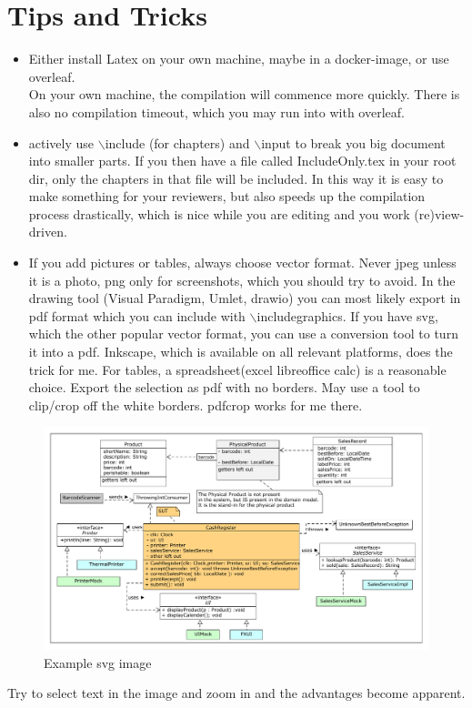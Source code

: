 \chapter{Tips and Tricks}

\begin{itemize}
\item Either install Latex on your own machine, maybe in a docker-image, or use overleaf. \\
    On your own machine, the compilation will commence more quickly. There is also no compilation timeout, which you may run into with overleaf.
\item actively use $\backslash$include (for chapters) and $\backslash$input to break you 
 big document into smaller parts. If you then have a file called IncludeOnly.tex in your root dir, only the chapters in that file will be included. In this way it is easy to make something for your reviewers, but also speeds up the compilation process drastically, which is nice while you are editing and you work (re)view-driven.
\item If you add pictures or tables, always choose vector format. Never jpeg unless it is a photo, png only for screenshots, which you should try to avoid. In the drawing tool (Visual Paradigm, Umlet, drawio)  you can most likely export in pdf format which you can include with $\backslash$includegraphics. If you have svg, which the other popular vector format, you can use a conversion tool to turn it into a pdf. Inkscape, which is available on all relevant platforms, does the trick for me.
For tables, a spreadsheet(excel libreoffice calc) is a reasonable choice. Export the selection as pdf with no borders. May use a tool to clip/crop off the white borders. pdfcrop works for me there.
\end{itemize}

\begin{figure}[htbp]
\caption{Example svg image}
\includegraphics[width=\linewidth]{images/perishablesales.pdf}
\end{figure}

Try to select text in the image and zoom in and the advantages become apparent.